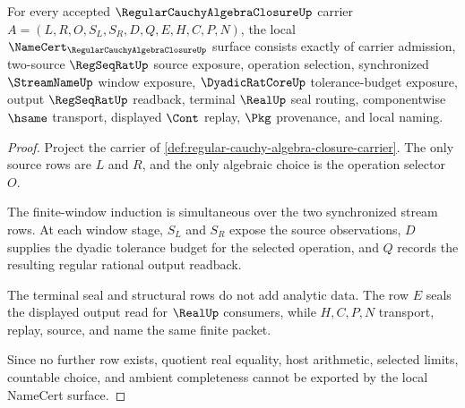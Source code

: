 \begin{theorem}
\label{thm:regular-cauchy-algebra-closure-namecert-obligations}
For every accepted $\RegularCauchyAlgebraClosureUp$ carrier $A=(L,R,O,S_L,S_R,D,Q,E,H,C,P,N)$, the local $\NameCert_{\RegularCauchyAlgebraClosureUp}$ surface consists exactly of carrier admission, two-source $\RegSeqRatUp$ source exposure, operation selection, synchronized $\StreamNameUp$ window exposure, $\DyadicRatCoreUp$ tolerance-budget exposure, output $\RegSeqRatUp$ readback, terminal $\RealUp$ seal routing, componentwise $\hsame$ transport, displayed $\Cont$ replay, $\Pkg$ provenance, and local naming.
\end{theorem}
\begin{proof}
Project the carrier of \autoref{def:regular-cauchy-algebra-closure-carrier}. The only source rows are $L$ and $R$, and the only algebraic choice is the operation selector $O$.

The finite-window induction is simultaneous over the two synchronized stream rows. At each window stage, $S_L$ and $S_R$ expose the source observations, $D$ supplies the dyadic tolerance budget for the selected operation, and $Q$ records the resulting regular rational output readback.

The terminal seal and structural rows do not add analytic data. The row $E$ seals the displayed output read for $\RealUp$ consumers, while $H,C,P,N$ transport, replay, source, and name the same finite packet.

Since no further row exists, quotient real equality, host arithmetic, selected limits, countable choice, and ambient completeness cannot be exported by the local NameCert surface.
\end{proof}

